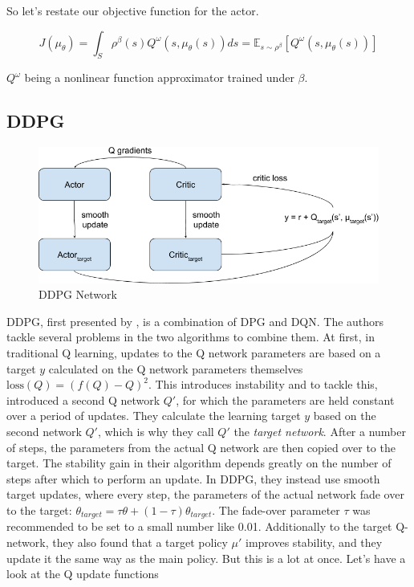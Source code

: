 \documentclass[hyperref,final,beleg]{cgvpub}
\begin{document}
So let's restate our objective function for the actor.

\begin{equation}
J(\mu_{\theta}) = \int_S \rho^{\beta}(s) Q^{\omega}(s,\mu_{\theta}(s)) ds = \mathbb{E}_{s \sim \rho^{\beta}}[Q^{\omega}(s,\mu_{\theta}(s))]
\end{equation}

$Q^{\omega}$ being a nonlinear function approximator trained under $\beta$.

\subsection{DDPG}
\label{sec:ddpg}

\begin{figure}
  \centering
  \includegraphics[width=0.6\linewidth]{images/DDPG_Setup.png}
  \caption{DDPG Network}
  \label{fig:ddpgsetup}
\end{figure}

\ac{DDPG}, first presented by \cite{lillicrapCONTINUOUSCONTROLDEEP2015}, is a combination of \ac{DPG} and \ac{DQN}. The authors tackle several problems in the two algorithms to combine them. At first, in traditional Q learning, updates to the Q network parameters are based on a target $y$ calculated on the Q network parameters themselves $\text{loss}(Q) = (f(Q)-Q)^2$. This introduces instability and to tackle this, \cite{mnihPlayingAtariDeep2013} introduced a second Q network $Q'$, for which the parameters are held constant over a period of updates. They calculate the learning target $y$ based on the second network $Q'$, which is why they call $Q'$ the \textit{target network}. After a number of steps, the parameters from the actual Q network are then copied over to the target. The stability gain in their algorithm depends greatly on the number of steps after which to perform an update. In \ac{DDPG}, they instead use smooth target updates, where every step, the parameters of the actual network fade over to the target: $\theta_{target} = \tau \theta + (1 - \tau) \theta_{target}$. The fade-over parameter $\tau$ was recommended to be set to a small number like 0.01. Additionally to the target Q-network, they also found that a target policy $\mu'$ improves stability, and they update it the same way as the main policy. But this is a lot at once. Let's have a look at the Q update functions
\end{document}
